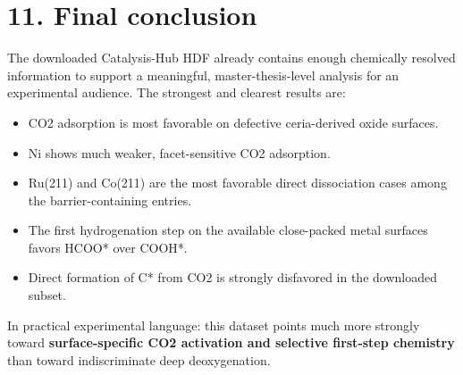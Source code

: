 \documentclass[11pt]{article}
\begin{document}
\section{11. Final conclusion}
The downloaded Catalysis-Hub HDF already contains enough chemically resolved information to support a meaningful, master-thesis-level analysis for an experimental audience.
The strongest and clearest results are:
\begin{itemize}
\item CO2 adsorption is most favorable on defective ceria-derived oxide surfaces.
\item Ni shows much weaker, facet-sensitive CO2 adsorption.
\item Ru(211) and Co(211) are the most favorable direct dissociation cases among the barrier-containing entries.
\item The first hydrogenation step on the available close-packed metal surfaces favors HCOO* over COOH*.
\item Direct formation of C* from CO2 is strongly disfavored in the downloaded subset.
\end{itemize}
In practical experimental language: this dataset points much more strongly toward \textbf{surface-specific CO2 activation and selective first-step chemistry} than toward indiscriminate deep deoxygenation.
\end{document}
